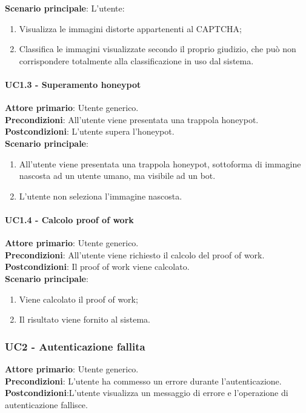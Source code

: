 \textbf{Scenario principale}: L'utente:
\begin{enumerate}
   \item Visualizza le immagini distorte appartenenti al CAPTCHA;
   \item Classifica le immagini visualizzate secondo il proprio giudizio, che può non corrispondere totalmente alla classificazione in uso dal sistema.
\end{enumerate}

\paragraph{UC1.3 - Superamento honeypot}
\textbf{Attore primario}: Utente generico.\\
\textbf{Precondizioni}: All'utente viene presentata una trappola honeypot.\\
\textbf{Postcondizioni}: L'utente supera l'honeypot.\\

\textbf{Scenario principale}:
\begin{enumerate}
   \item All'utente viene presentata una trappola honeypot, sottoforma di immagine nascosta ad un utente umano, ma visibile ad un bot.
   \item L'utente non seleziona l'immagine nascosta.
\end{enumerate}

\paragraph{UC1.4 - Calcolo proof of work}
\textbf{Attore primario}: Utente generico.\\
\textbf{Precondizioni}: All'utente viene richiesto il calcolo del proof of work.\\
\textbf{Postcondizioni}: Il proof of work viene calcolato.\\

\textbf{Scenario principale}:
\begin{enumerate}
   \item Viene calcolato il proof of work;
   \item Il risultato viene fornito al sistema.
\end{enumerate}

\subsubsection{UC2 - Autenticazione fallita}
\textbf{Attore primario}: Utente generico.\\
\textbf{Precondizioni}: L’utente ha commesso un errore durante l'autenticazione.\\
\textbf{Postcondizioni}:L’utente visualizza un messaggio di errore e l’operazione di autenticazione fallisce.\\

